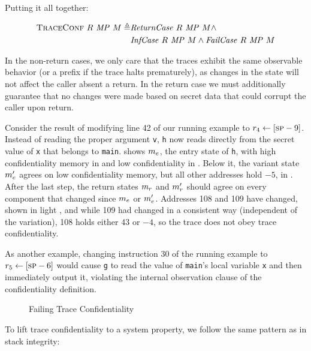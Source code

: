 \documentclass[acmsmall,review,anonymous]{acmart}\settopmatter{printfolios=true,printccs=false,printacmref=false}
\begin{document}
Putting it all together:

\[\begin{split}
  \text{\sc TraceConf} ~ R ~ \mathit{MP} ~ M \triangleq
  & \mathit{ReturnCase} ~ R ~ \mathit{MP} ~ M \land \\
  & \mathit{InfCase} ~ R ~ \mathit{MP} ~ M \land
    \mathit{FailCase} ~ R ~ \mathit{MP} ~ M \\
\end{split}\]

In the non-return cases, we only care that the traces exhibit the same
observable behavior (or a prefix if the trace halts prematurely), as changes
in the state will not affect the caller absent a return.  In the return case
we must additionally guarantee that no changes were made based on secret data
that could corrupt the caller upon return.

Consider the result of modifying line 42 of our running example to $r_4 \leftarrow [\textsc{sp} - 9]$.
Instead of reading the proper argument {\tt v}, {\tt h} now reads directly from the
secret value of {\tt x} that belongs to {\tt main}. 
shows \(m_e\), the entry state of {\tt h}, with high confidentiality memory
in {\high} and low confidentiality in {\low}. Below it, the variant state
\(m_e'\) agrees on low confidentiality memory, but all other addresses
hold $-5$, in {\varied}.  After the last step, the return states \(m_r\) and
\(m_r'\) should agree on every component that changed since \(m_e\) or
\(m_e'\). Addresses 108 and 109 have changed, shown in light {\low}, and while 109
had changed in a consistent way (independent of the variation), 108 holds either 43 or $-4$, so the trace does not obey trace confidentiality.

As another example, changing instruction 30 of the running example to
$r_5 \leftarrow [\textsc{sp} - 6]$ would cause {\tt g} to read the value of
{\tt main}'s local variable {\tt x} and then immediately output it,
violating the internal observation clause of the confidentiality
definition.

\begin{figure}
  \confidentialityendexample
  \caption{Failing Trace Confidentiality}
  \label{fig:confex}
\end{figure}

To lift trace confidentiality to a system property, we follow the same
pattern as in stack integrity:
\end{document}

